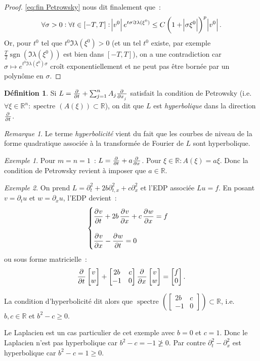 \documentclass{report}
\DeclareMathOperator{\spectreOperator}{spectre\!}
\DeclareMathOperator{\sgn}{sgn}
\newcommand{\R}{{\mathbb R}}
\newcommand{\spectre}[1]{{\spectreOperator\left(#1\right)}}
\theoremstyle{definition}
\newtheorem{déf}[thm]{Définition}
\theoremstyle{remark}
\newtheorem*{rmq}{Remarque}
\newtheorem{ex}{Exemple}[chapter]
\begin{document}
\begin{proof}
\eqref{eq:fin Petrowsky} nous dit finalement que~:
\[\forall \sigma > 0 : \forall t \in [-T, T] : \abs {v^0}e^{t\sigma\Im\lambda(\xi^0)} \leq C\left(1 + \abs {\sigma\xi^0}\right)^p\abs {v^0}.\]
Or, pour $t^0$ tel que $t^0\Im\lambda(\xi^0) > 0$ (et un tel $t^0$ existe, par exemple $\frac T2\sgn(\Im\lambda(\xi^0))$ est bien dans $[-T, T]$), on a une contradiction car
$\sigma \mapsto e^{t^0\Im\lambda(\xi^0)\sigma}$ croît exponentiellement et ne peut pas être bornée par un polynôme en $\sigma$.
\end{proof}

\begin{déf} Si $L = \pd {}t + \sum_{j=1}^nA_j\pd {}{x_j}$ satisfait la condition de Petrowsky (i.e. $\forall \xi \in \R^n : \spectre {A(\xi)} \subset \R$), on dit que
$L$ est \textit{hyperbolique} dans la direction $\pd {}t$.
\end{déf}

\begin{rmq} Le terme \textit{hyperbolicité} vient du fait que les courbes de niveau de la forme quadratique associée à la transformée de Fourier de $L$ sont hyperbolique.
\end{rmq}

\begin{ex}
Pour $m=n=1$~: $L = \pd {}t + a\pd {}x$. Pour $\xi \in \R : A(\xi) = a\xi$. Donc la condition de Petrowsky revient à imposer que $a \in \R$.
\end{ex}

\begin{ex}
On prend $L = \partial^2_t + 2b\partial^2_{t,x} + c\partial^2_x$ et l'EDP associée $Lu = f$. En posant $v = \partial_t u$ et $w = \partial_x u$, l'EDP devient~:
\[\begin{cases}\dpd vt + 2b\dpd vx + c\dpd wx = f\\&\\\dpd vx - \dpd wt = 0\end{cases}\]
ou sous forme matricielle~:
\[\dpd {}t\begin{bmatrix}v \\ w\end{bmatrix} + \begin{bmatrix}2b & c \\-1 & 0\end{bmatrix}\dpd {}x\begin{bmatrix}v \\ w\end{bmatrix} = \begin{bmatrix}f \\ 0\end{bmatrix}.\]

La condition d'hyperbolicité dit alors que $\spectre {\begin{bmatrix}2b & c \\-1 & 0\end{bmatrix}} \subset \R$, i.e. $b,c \in \R$ et $b^2-c \geq 0$.

Le Laplacien est un cas particulier de cet exemple avec $b=0$ et $c=1$. Donc le Laplacien n'est pas hyperbolique car $b^2-c = -1 \not \geq 0$.
Par contre $\partial_t^2 - \partial_x^2$ est hyperbolique car $b^2 - c = 1 \geq 0$.
\end{ex}
\end{document}
